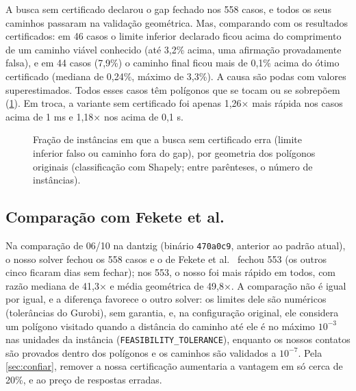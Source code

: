 \documentclass[11pt,a4paper]{article}
\theoremstyle{plain}\newtheorem{proposicao}{Proposição}
\theoremstyle{definition}\newtheorem{definicao}{Definição}
\theoremstyle{plain}\newtheorem{teorema}{Teorema}
\newcommand{\code}[1]{\texttt{\small #1}}
\begin{document}
A busca sem certificado declarou o gap fechado nos 558 casos, e todos os seus caminhos passaram na validação geométrica. Mas, comparando com os resultados certificados: em 46 casos o limite inferior declarado ficou acima do comprimento de um caminho viável conhecido (até 3,2\% acima, uma afirmação provadamente falsa), e em 44 casos (7,9\%) o caminho final ficou mais de 0,1\% acima do ótimo certificado (mediana de 0,24\%, máximo de 3,3\%). A causa são podas com valores superestimados. Todos esses casos têm polígonos que se tocam ou se sobrepõem (\cref{fig:confianca}). Em troca, a variante sem certificado foi apenas 1,26× mais rápida nos casos acima de 1 ms e 1,18× nos acima de 0,1 s.

\begin{figure}[ht]\centering\figconfianca
\caption{Fração de instâncias em que a busca sem certificado erra (limite inferior falso ou caminho fora do gap), por geometria dos polígonos originais (classificação com Shapely; entre parênteses, o número de instâncias).}\label{fig:confianca}
\end{figure}

\subsection{Comparação com Fekete et al.}
Na comparação de 06/10 na dantzig (binário \code{470a0c9}, anterior ao padrão atual), o nosso solver fechou os 558 casos e o de Fekete et al.~\cite{fekete} fechou 553 (os outros cinco ficaram dias sem fechar); nos 553, o nosso foi mais rápido em todos, com razão mediana de 41,3× e média geométrica de 49,8×. A comparação não é igual por igual, e a diferença favorece o outro solver: os limites dele são numéricos (tolerâncias do Gurobi), sem garantia, e, na configuração original, ele considera um polígono visitado quando a distância do caminho até ele é no máximo \(10^{-3}\) nas unidades da instância (\code{FEASIBILITY\_TOLERANCE}), enquanto os nossos contatos são provados dentro dos polígonos e os caminhos são validados a \(10^{-7}\). Pela \cref{sec:confiar}, remover a nossa certificação aumentaria a vantagem em só cerca de 20\%, e ao preço de respostas erradas.

\end{document}
